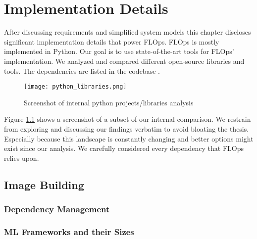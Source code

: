 \chapter{Implementation Details}

After discussing requirements and simplified system models this chapter discloses significant implementation details that power FLOps.
FLOps is mostly implemented in Python.
Our goal is to use state-of-the-art tools for FLOps' implementation.
We analyzed and compared different open-source libraries and tools.
The dependencies are listed in the codebase \cite{flops_code}.

\begin{figure}[h]
    \begin{adjustwidth}{-0.175\paperwidth}{-0.175\paperwidth}
        \centering
        \texttt{[image: python\_libraries.png]}
        \caption{Screenshot of internal python projects/libraries analysis}
        \label{fig:python_projects_libraries}
    \end{adjustwidth}
\end{figure}

Figure \ref{fig:python_projects_libraries} shows a screenshot of a subset of our internal comparison.
We restrain from exploring and discussing our findings verbatim to avoid bloating the thesis.
Especially because this landscape is constantly changing and better options might exist since our analysis. 
We carefully considered every dependency that FLOps relies upon.



\section{Image Building}

    \subsection{Dependency Management}

    \subsection{ML Frameworks and their Sizes}

